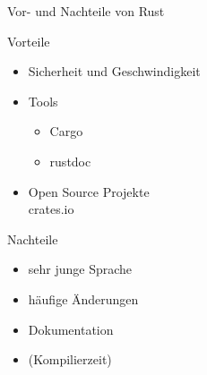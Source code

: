 \documentclass{beamer}
\begin{document}
\begin{frame}{Vor- und Nachteile von Rust}
\pause
\begin{minipage}[t]{.45\textwidth}
Vorteile
\begin{itemize}
  \item Sicherheit und Geschwindigkeit
  \item Tools
  \begin{itemize}
    \item Cargo
    \item rustdoc
  \end{itemize}
  \item Open Source Projekte \\ crates.io
\end{itemize}
\end{minipage}
\hfill
\begin{minipage}[t]{.45\textwidth}
\pause
Nachteile
\begin{itemize}
  \item sehr junge Sprache
  \item häufige Änderungen 
  \item Dokumentation   
  \item (Kompilierzeit)
\end{itemize}
\end{minipage}
\end{frame}

%
\end{document}
